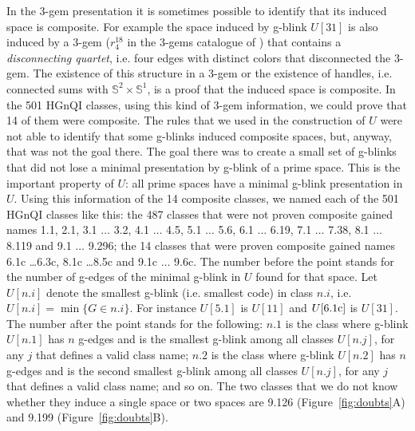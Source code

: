 \enlargethispage{0.5cm}
In the 3-gem presentation it is sometimes possible to identify that
its induced space is composite. For example the space induced by g-blink $U[31]$
is also induced by a 3-gem ($r_4^{18}$ in the 3-gems catalogue of \cite{Lins1995}) that
contains a {\em disconnecting quartet}, i.e. four edges with distinct colors
that disconnected the 3-gem. The existence of this structure in a 3-gem
or the existence of handles, i.e. connected sums with $\mathbb{S}^2 \times \mathbb{S}^1$,
is a proof that the induced space is composite. In the 501 HGnQI classes, using
this kind of 3-gem information, we could prove that 14 of them were composite. The
rules that we used in the construction of $U$ were not able to identify that
some g-blinks induced composite spaces, but, anyway, that was not the goal there. The
goal there was to create a small set of g-blinks that did not lose a minimal
presentation by g-blink of a prime space. This is the important property of $U$:
all prime spaces have a minimal g-blink presentation in $U$. Using this information
of the 14 composite classes, we named each of the 501 HGnQI classes like this:
the 487 classes that were not proven composite gained names 1.1, 2.1, 3.1  $\ldots$  3.2,
4.1 $\ldots$ 4.5, 5.1 $\ldots$ 5.6, 6.1 $\ldots$ 6.19, 7.1 $\ldots$ 7.38, 8.1 $\ldots$ 8.119
and 9.1 $\ldots$ 9.296; the 14 classes that were proven composite gained names 6.1c \ldots 6.3c,
8.1c \ldots 8.5c and 9.1c $\ldots$ 9.6c. The number before the point stands for
the number of g-edges of the minimal g-blink in $U$ found for that space.
Let $U[n.i]$ denote the smallest g-blink (i.e. smallest code) in class $n.i$, i.e.
$U[n.i] = \min\{G \in n.i\}$. For instance $U[5.1]$ is $U[11]$ and $U[6.1{\rm c}]$ is $U[31]$.
The number after the point stands for the following: $n.1$ is the class
where g-blink $U[n.1]$ has $n$ g-edges and is the smallest g-blink among all
classes $U[n.j]$, for any $j$ that defines a valid class name; $n.2$ is the class
where g-blink $U[n.2]$ has $n$ g-edges and is the second smallest g-blink among all
classes $U[n.j]$, for any $j$ that defines a valid class name; and so on. The two
classes that we do not know whether they induce a single space or two spaces are 9.126
(Figure~\ref{fig:doubts}A) and 9.199 (Figure~\ref{fig:doubts}B).


